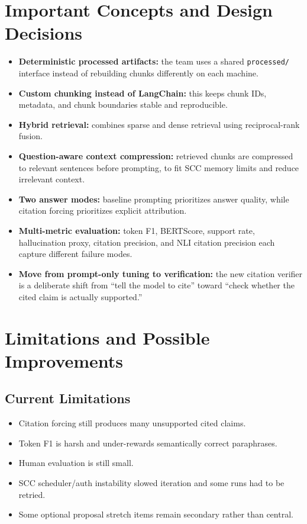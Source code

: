 \documentclass[11pt]{article}
\begin{document}
\section{Important Concepts and Design Decisions}
\begin{itemize}
  \item \textbf{Deterministic processed artifacts:} the team uses a shared \texttt{processed/} interface instead of rebuilding chunks differently on each machine.
  \item \textbf{Custom chunking instead of LangChain:} this keeps chunk IDs, metadata, and chunk boundaries stable and reproducible.
  \item \textbf{Hybrid retrieval:} combines sparse and dense retrieval using reciprocal-rank fusion.
  \item \textbf{Question-aware context compression:} retrieved chunks are compressed to relevant sentences before prompting, to fit SCC memory limits and reduce irrelevant context.
  \item \textbf{Two answer modes:} baseline prompting prioritizes answer quality, while citation forcing prioritizes explicit attribution.
  \item \textbf{Multi-metric evaluation:} token F1, BERTScore, support rate, hallucination proxy, citation precision, and NLI citation precision each capture different failure modes.
  \item \textbf{Move from prompt-only tuning to verification:} the new citation verifier is a deliberate shift from ``tell the model to cite'' toward ``check whether the cited claim is actually supported.''
\end{itemize}

\section{Limitations and Possible Improvements}
\subsection{Current Limitations}
\begin{itemize}
  \item Citation forcing still produces many unsupported cited claims.
  \item Token F1 is harsh and under-rewards semantically correct paraphrases.
  \item Human evaluation is still small.
  \item SCC scheduler/auth instability slowed iteration and some runs had to be retried.
  \item Some optional proposal stretch items remain secondary rather than central.
\end{itemize}
\end{document}
